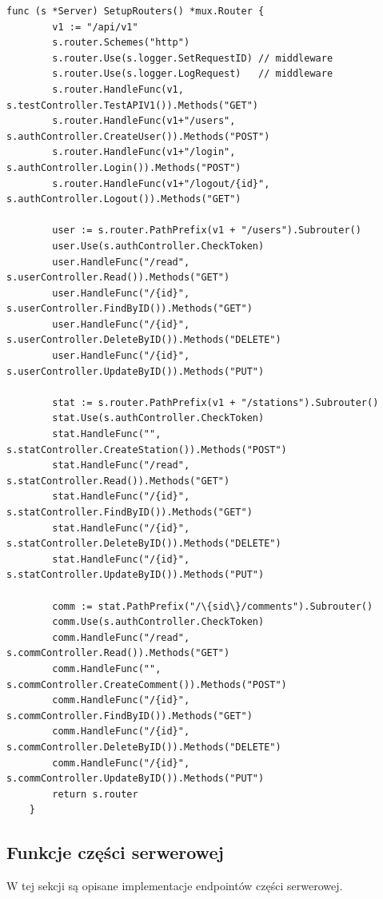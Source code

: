 \begin{lstlisting}[label=list:routers,caption=Implementacja punktów końcowych.,basicstyle=\tiny\ttfamily]
    func (s *Server) SetupRouters() *mux.Router {
        v1 := "/api/v1"
        s.router.Schemes("http")
        s.router.Use(s.logger.SetRequestID) // middleware
        s.router.Use(s.logger.LogRequest)   // middleware
        s.router.HandleFunc(v1, s.testController.TestAPIV1()).Methods("GET")
        s.router.HandleFunc(v1+"/users", s.authController.CreateUser()).Methods("POST")
        s.router.HandleFunc(v1+"/login", s.authController.Login()).Methods("POST")
        s.router.HandleFunc(v1+"/logout/{id}", s.authController.Logout()).Methods("GET")

        user := s.router.PathPrefix(v1 + "/users").Subrouter()
        user.Use(s.authController.CheckToken)
        user.HandleFunc("/read", s.userController.Read()).Methods("GET")
        user.HandleFunc("/{id}", s.userController.FindByID()).Methods("GET")
        user.HandleFunc("/{id}", s.userController.DeleteByID()).Methods("DELETE")
        user.HandleFunc("/{id}", s.userController.UpdateByID()).Methods("PUT")

        stat := s.router.PathPrefix(v1 + "/stations").Subrouter()
        stat.Use(s.authController.CheckToken)
        stat.HandleFunc("", s.statController.CreateStation()).Methods("POST")
        stat.HandleFunc("/read", s.statController.Read()).Methods("GET")
        stat.HandleFunc("/{id}", s.statController.FindByID()).Methods("GET")
        stat.HandleFunc("/{id}", s.statController.DeleteByID()).Methods("DELETE")
        stat.HandleFunc("/{id}", s.statController.UpdateByID()).Methods("PUT")

        comm := stat.PathPrefix("/\{sid\}/comments").Subrouter()
        comm.Use(s.authController.CheckToken)
        comm.HandleFunc("/read", s.commController.Read()).Methods("GET")
        comm.HandleFunc("", s.commController.CreateComment()).Methods("POST")
        comm.HandleFunc("/{id}", s.commController.FindByID()).Methods("GET")
        comm.HandleFunc("/{id}", s.commController.DeleteByID()).Methods("DELETE")
        comm.HandleFunc("/{id}", s.commController.UpdateByID()).Methods("PUT")
        return s.router
    }
\end{lstlisting}

% 
\subsection{Funkcje części serwerowej}
W tej sekcji są opisane implementacje endpointów części serwerowej.
% 
